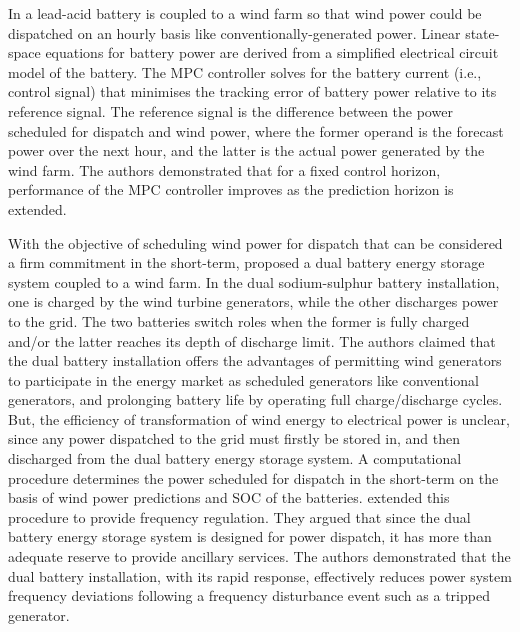 In \citet{TBBH10} a lead-acid battery is coupled to a wind farm so that wind power could be dispatched on an hourly basis like conventionally-generated power.  Linear state-space equations for battery power are derived from a simplified electrical circuit model of the battery.  The MPC controller solves for the battery current (i.e., control signal) that minimises the tracking error of battery power relative to its reference signal.  The reference signal is the difference between the power scheduled for dispatch and wind power, where the former operand is the forecast power over the next hour, and the latter is the actual power generated by the wind farm.  The authors demonstrated that for a fixed control horizon, performance of the MPC controller improves as the prediction horizon is extended.

With the objective of scheduling wind power for dispatch that can be considered a firm commitment in the short-term, \citet{YCTL10,YCTL12} proposed a dual battery energy storage system coupled to a wind farm.  In the dual sodium-sulphur battery installation, one is charged by the wind turbine generators, while the other discharges power to the grid.  The two batteries switch roles when the former is fully charged and/or the latter reaches its depth of discharge limit.  The authors claimed that the dual battery installation offers the advantages of permitting wind generators to participate in the energy market as scheduled generators like conventional generators, and prolonging battery life by operating full charge/discharge cycles.  But, the efficiency of transformation of wind energy to electrical power is unclear, since any power dispatched to the grid must firstly be stored in, and then discharged from the dual battery energy storage system.  A computational procedure determines the power scheduled for dispatch in the short-term on the basis of wind power predictions and SOC of the batteries.  \citet{YCTL14} extended this procedure to provide frequency regulation.  They argued that since the dual battery energy storage system is designed for power dispatch, it has more than adequate reserve to provide ancillary services.  The authors demonstrated that the dual battery installation, with its rapid response, effectively reduces power system frequency deviations following a frequency disturbance event such as a tripped generator.

